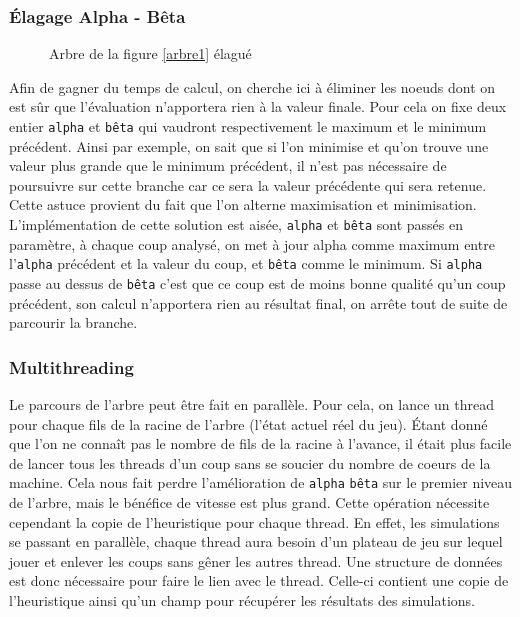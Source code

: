 \documentclass[a4paper,11pt]{article}
\begin{document}
\subsubsection{Élagage Alpha - Bêta}

\begin{figure}
    \centering
    \caption{Arbre de la figure \ref{arbre1} élagué}
    \label{arbre2}
\end{figure}

Afin de gagner du temps de calcul, on cherche ici à éliminer les noeuds dont on est sûr que l'évaluation n'apportera rien à la valeur finale. Pour cela on fixe deux entier \verb+alpha+ et \verb+bêta+ qui vaudront respectivement le maximum et le minimum précédent. Ainsi par exemple, on sait que si l'on minimise et qu'on trouve une valeur plus grande que le minimum précédent, il n'est pas nécessaire de poursuivre sur cette branche car ce sera la valeur précédente qui sera retenue. Cette astuce provient du fait que l'on alterne maximisation et minimisation. \\
L'implémentation de cette solution est aisée, \verb+alpha+ et \verb+bêta+ sont passés en paramètre, à chaque coup analysé, on met à jour alpha comme maximum entre l'\verb+alpha+ précédent et la valeur du coup, et \verb+bêta+ comme le minimum. Si \verb+alpha+ passe au dessus de \verb+bêta+ c'est que ce coup est de moins bonne qualité qu'un coup précédent, son calcul n'apportera rien au résultat final, on arrête tout de suite de parcourir la branche.

\subsubsection{Multithreading}

Le parcours de l'arbre peut être fait en parallèle. Pour cela, on lance un thread pour chaque fils de la racine de l'arbre (l'état actuel réel du jeu). Étant donné que l'on ne connaît pas le nombre de fils de la racine à l'avance, il était plus facile de lancer tous les threads d'un coup sans se soucier du nombre de coeurs de la machine. Cela nous fait perdre l'amélioration de \verb+alpha+ \verb+bêta+ sur le premier niveau de l'arbre, mais le bénéfice de vitesse est plus grand. Cette opération nécessite cependant la copie de l'heuristique pour chaque thread. En effet, les simulations se passant en parallèle, chaque thread aura besoin d'un plateau de jeu sur lequel jouer et enlever les coups sans gêner les autres thread. Une structure de données est donc nécessaire pour faire le lien avec le thread. Celle-ci contient une copie de l'heuristique ainsi qu'un champ pour récupérer les résultats des simulations.
\end{document}
